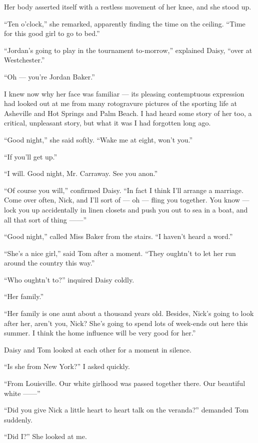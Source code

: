 \documentclass{znotebook}
\begin{document}
Her body asserted itself with a restless movement of her knee, and she stood up.

``Ten o’clock,'' she remarked, apparently finding the time on the ceiling. ``Time for this good girl to go to bed.''

``Jordan’s going to play in the tournament to-morrow,'' explained Daisy, ``over at Westchester.''

``Oh — you’re Jordan Baker.''

I knew now why her face was familiar — its pleasing contemptuous expression had looked out at me from many rotogravure pictures of the sporting life at Asheville and Hot Springs and Palm Beach. I had heard some story of her too, a critical, unpleasant story, but what it was I had forgotten long ago.

``Good night,'' she said softly. ``Wake me at eight, won’t you.''

``If you’ll get up.''

``I will. Good night, Mr. Carraway. See you anon.''

``Of course you will,'' confirmed Daisy. ``In fact I think I’ll arrange a marriage. Come over often, Nick, and I’ll sort of — oh — fling you together. You know — lock you up accidentally in linen closets and push you out to sea in a boat, and all that sort of thing ——''

``Good night,'' called Miss Baker from the stairs. ``I haven’t heard a word.''

``She’s a nice girl,'' said Tom after a moment. ``They oughtn’t to let her run around the country this way.''

``Who oughtn’t to?'' inquired Daisy coldly.

``Her family.''

``Her family is one aunt about a thousand years old. Besides, Nick’s going to look after her, aren’t you, Nick? She’s going to spend lots of week-ends out here this summer. I think the home influence will be very good for her.''

Daisy and Tom looked at each other for a moment in silence.

``Is she from New York?'' I asked quickly.

``From Louisville. Our white girlhood was passed together there. Our beautiful white ——''

``Did you give Nick a little heart to heart talk on the veranda?'' demanded Tom suddenly.

``Did I?'' She looked at me.
\end{document}
